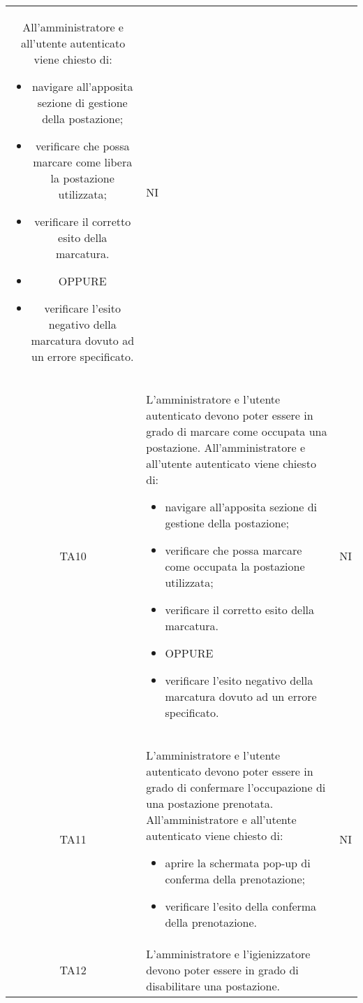{\begin{longtable}{ c C{11cm} c }
        All'amministratore e all'utente autenticato viene chiesto di:
        \begin{itemize}
            \item navigare all'apposita sezione di gestione della postazione;
            \item verificare che possa marcare come libera la postazione utilizzata;
            \item verificare il corretto esito della marcatura.
            \item [] OPPURE
            \item verificare l'esito negativo della marcatura dovuto ad un errore specificato.
        \end{itemize}&
        NI\\
        TA10&
        L'amministratore e l'utente autenticato devono poter essere in grado di marcare come occupata una postazione.\newline
        All'amministratore e all'utente autenticato viene chiesto di:
        \begin{itemize}
            \item navigare all'apposita sezione di gestione della postazione;
            \item verificare che possa marcare come occupata la postazione utilizzata;
            \item verificare il corretto esito della marcatura.
            \item [] OPPURE
            \item verificare l'esito negativo della marcatura dovuto ad un errore specificato.
        \end{itemize}&
        NI\\
        TA11&
        L'amministratore e l'utente autenticato devono poter essere in grado di confermare l'occupazione di una postazione prenotata.\newline
        All'amministratore e all'utente autenticato viene chiesto di:
        \begin{itemize}
            \item aprire la schermata pop-up di conferma della prenotazione;
            \item verificare l'esito della conferma della prenotazione.
        \end{itemize}&
        NI\\
        TA12&
        L'amministratore e l'igienizzatore devono poter essere in grado di disabilitare una postazione.\newline

\end{longtable}}
